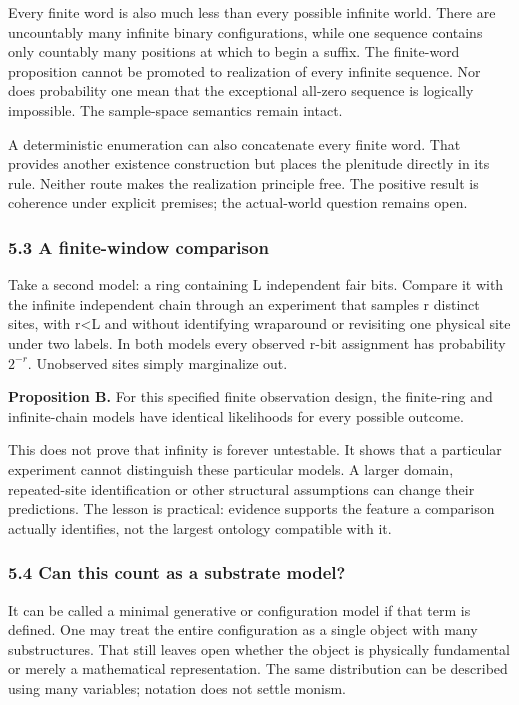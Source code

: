 \documentclass[
  10pt,
  a4paper,
]{article}
\begin{document}
Every finite word is also much less than every possible infinite world.
There are uncountably many infinite binary configurations, while one
sequence contains only countably many positions at which to begin a
suffix. The finite-word proposition cannot be promoted to realization of
every infinite sequence. Nor does probability one mean that the
exceptional all-zero sequence is logically impossible. The sample-space
semantics remain intact.

A deterministic enumeration can also concatenate every finite word. That
provides another existence construction but places the plenitude
directly in its rule. Neither route makes the realization principle
free. The positive result is coherence under explicit premises; the
actual-world question remains open.

\subsubsection{5.3 A finite-window
comparison}\label{a-finite-window-comparison}

Take a second model: a ring containing L independent fair bits. Compare
it with the infinite independent chain through an experiment that
samples r distinct sites, with r\textless L and without identifying
wraparound or revisiting one physical site under two labels. In both
models every observed r-bit assignment has probability \(2^{-r}\).
Unobserved sites simply marginalize out.

\textbf{Proposition B.} For this specified finite observation design,
the finite-ring and infinite-chain models have identical likelihoods for
every possible outcome.

This does not prove that infinity is forever untestable. It shows that a
particular experiment cannot distinguish these particular models. A
larger domain, repeated-site identification or other structural
assumptions can change their predictions. The lesson is practical:
evidence supports the feature a comparison actually identifies, not the
largest ontology compatible with it.

\subsubsection{5.4 Can this count as a substrate
model?}\label{can-this-count-as-a-substrate-model}

It can be called a minimal generative or configuration model if that
term is defined. One may treat the entire configuration as a single
object with many substructures. That still leaves open whether the
object is physically fundamental or merely a mathematical
representation. The same distribution can be described using many
variables; notation does not settle monism.
\end{document}
